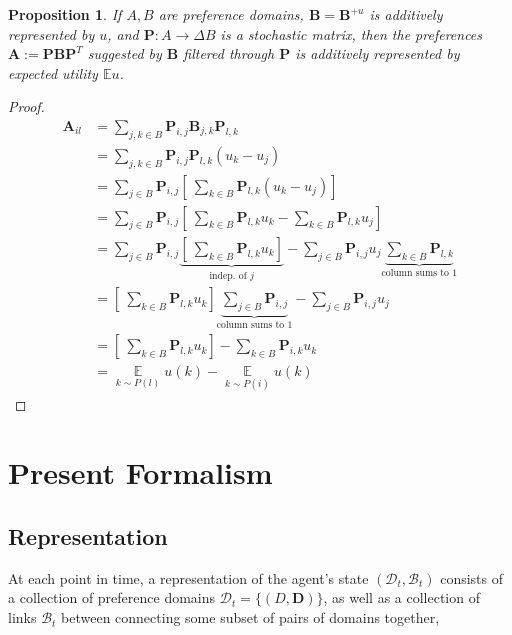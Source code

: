 \documentclass{article}
\theoremstyle{plain}
\newtheorem{prop}[theorem]{Proposition}
\theoremstyle{definition}
\theoremstyle{remark}
\newcommand\mat[1]{\mathbf #1}
\begin{document}
	\begin{prop}
		If $A, B$ are preference domains, $\mat B = \mat B^{+u}$ is additively represented by $u$, and $\mat P : A \to \Delta B$ is a stochastic matrix, then the preferences $\mat A := \mat P \mat B \mat P^T$ suggested by $\mat B$ filtered through $\mat P$ is additively represented by expected utility $\mathbb E u$.
	\end{prop}
	\begin{proof}
		\begin{align*}
			\mat A_{il} &= \sum_{j,k \in B} \mat P_{i,j} \mat B_{j,k} \mat P_{l,k} \\
				&= \sum_{j,k \in B} \mat P_{i,j}  \mat P_{l,k} (u_k - u_j) \\
				&= \sum_{j \in B} \mat P_{i,j} \left[ ~\sum_{k \in B} \mat P_{l,k} (u_k - u_j)\right]\\
				&= \sum_{j \in B} \mat P_{i,j} \left[ ~\sum_{k \in B} \mat P_{l,k} u_k - \sum_{k \in B} \mat P_{l,k} u_j \right] \\
				&= \sum_{j \in B} \mat P_{i,j} \underbrace{\left[ ~\sum_{k \in B} \mat P_{l,k} u_k  \right]}_{\text{indep. of $j$}} -  \sum_{j \in B} \mat P_{i,j} u_j \underbrace{\sum_{k \in B} \mat P_{l,k}}_{\text{column sums to 1}} \\
				&= \left[ ~\sum_{k \in B} \mat P_{l,k} u_k  \right] \underbrace{\sum_{j \in B} \mat P_{i,j}}_{\text{column sums to 1}} -  \sum_{j \in B} \mat P_{i,j} u_j \\
				&= \left[ ~\sum_{k \in B} \mat P_{l,k} u_k  \right]  -  \sum_{k \in B} \mat P_{i,k} u_k \\
				&= \mathop{\mathbb E}\limits_{k \sim P(l)} u(k) - \mathop{\mathbb E}\limits_{k \sim P(i)} u(k)
		\end{align*}
	\end{proof}

	\section{Present Formalism}
	\subsection{Representation}
	At each point in time, a representation of the agent's state $(\mathcal D_t, \mathcal B_t)$ consists of a collection of preference domains $\mathcal D_t = \{ (D, \mat D) \}$, as well as a collection of links $\mathcal B_t$ between connecting some subset of pairs of domains together,	
	
\end{document}
